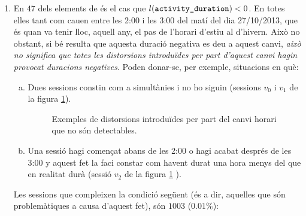 \documentclass[
	a4paper,
	twoside,
	justified
]{tufte-book}
\begin{document}
\begin{enumerate}[(1)]
\item En $47$ dels elements de  és el cas que $l(\texttt{activity\_duration}) < 0$. En totes elles tant  com  cauen entre les 2:00 i les 3:00 del matí del dia 27/10/2013, que és quan va tenir lloc, aquell any, el pas de l'horari d'estiu al d'hivern. Això no obstant, si bé resulta que aquesta duració negativa es deu a aquest canvi, \emph{això no significa que totes les distorsions introduïdes per part d'aquest canvi hagin provocat duracions negatives}. Poden donar-se, per exemple, situacions en què:

  \begin{enumerate}[(a)]
  \item Dues sessions constin com a simultànies i no ho siguin (sessions $v_0$ i $v_1$ de la figura \ref{dia:session_distortions}).
  
  \begin{figure}
  \begin{center}
  \end{center}
  \caption{
  	\label{dia:session_distortions}
		Exemples de distorsions introduïdes per part del canvi horari que no són detectables. 
  }
  \end{figure}
  
  \item Una sessió hagi començat abans de les 2:00 o hagi acabat després de les 3:00 y aquest fet la faci constar com havent durat una hora menys del que en realitat durà (sessió $v_2$ de la figura \ref{dia:session_distortions} ). 
  \end{enumerate}

Les sessions que compleixen la condició següent (és a dir, aquelles que són problemàtiques a causa d'aquest fet), són $1003$ ($0.01\%$):


\end{enumerate}
\end{document}
